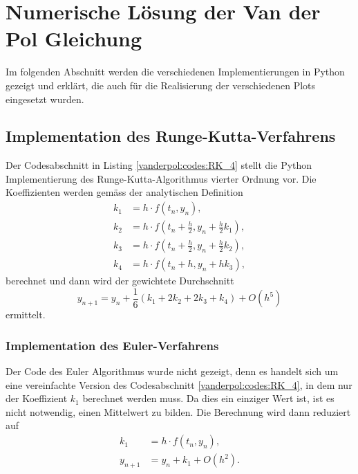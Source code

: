 %
%
%
\section{Numerische Lösung der Van der Pol Gleichung
\label{vanderpol:section:loesung}}
Im folgenden Abschnitt werden die verschiedenen Implementierungen in Python gezeigt und erklärt, die auch für die Realisierung der verschiedenen Plots eingesetzt wurden.

\subsection{Implementation des Runge-Kutta-Verfahrens
\label{vanderpol:subsection:rk}}
Der Codesabschnitt in Listing \ref{vanderpol:codes:RK_4} stellt die Python Implementierung des Runge-Kutta-Algorithmus vierter Ordnung vor. Die Koeffizienten werden gemäss der analytischen Definition
\begin{align*}
k_1 &= h \cdot f(t_n, y_n),\\
k_2 &= h \cdot f\left(t_n + \frac{h}{2}, y_n + \frac{h}{2} k_1\right), \\
k_3 &= h \cdot f\left(t_n + \frac{h}{2}, y_n + \frac{h}{2} k_2\right), \\
k_4 &= h \cdot f(t_n + h, y_n + h k_3),
\end{align*}
berechnet und dann wird der gewichtete Durchschnitt
\begin{equation}
y_{n+1} = y_n + \frac{1}{6}(k_1 + 2k_2 + 2k_3 + k_4) +O(h^5)
\end{equation}
ermittelt.
\subsubsection{Implementation des Euler-Verfahrens
\label{vanderpol:subsubsection:euler}}
Der Code des Euler Algorithmus wurde nicht gezeigt, denn es handelt sich um eine vereinfachte Version des Codesabschnitt \ref{vanderpol:codes:RK_4}, in dem nur der Koeffizient $k_1$ berechnet werden muss. Da dies ein einziger Wert ist, ist es nicht notwendig, einen Mittelwert zu bilden. Die Berechnung wird dann reduziert auf
\begin{align*}
k_1 &= h \cdot f(t_n, y_n), \\
y_{n+1} &= y_n + k_1 +O(h^2).
\end{align*}

